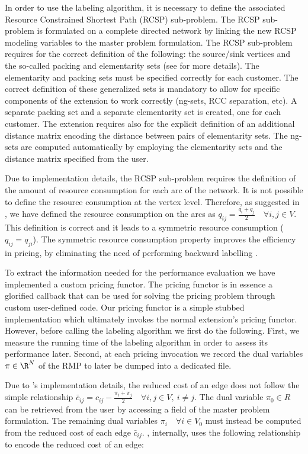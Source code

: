 In order to use the \vrpsolver{} labeling algorithm, it is necessary
to define the associated Resource Constrained Shortest Path (RCSP) sub-problem.
The RCSP sub-problem is formulated on a complete directed network by
linking the new RCSP modeling variables to the master problem formulation.
The RCSP sub-problem requires for the correct definition of the following:
the source/sink vertices and the so-called packing and elementarity sets
(see \cite{pessoa2020generic} for more details).
The elementarity and packing sets must be specified correctly for each customer.
The correct definition of these generalized sets is mandatory to allow for specific
components of the \vrpsolver{} extension to work correctly (ng-sets, RCC separation, etc).
A separate packing set and a separate elementarity set is created, one for each customer.
The \vrpsolver{} extension requires also for the explicit definition of an additional
distance matrix encoding the distance between pairs of elementarity sets.
The ng-sets are computed automatically by employing the elementarity sets
and the distance matrix specified from the user.

Due to implementation details, the RCSP sub-problem requires
the definition of the amount of resource consumption for each arc of the network.
It is not possible to define the resource consumption at the vertex level.
Therefore, as suggested in \textcite{pessoa2020generic}, we have defined the resource consumption
on the arcs as $q_{ij} = \frac{q_{i} + q_{j}}{2} \quad \forall i, j \in V$.
This definition is correct and it leads to a symmetric resource consumption ($q_{ij} = q_{ji}$).
The symmetric resource consumption property improves the efficiency in pricing,
by eliminating the need of performing backward labelling \parencite{pessoa2020generic}.

To extract the information needed for the performance evaluation we have implemented a custom pricing functor.
The pricing functor is in essence a glorified callback that can be used
for solving the pricing problem through custom user-defined code.
Our pricing functor is a simple stubbed implementation which ultimately invokes
the normal \vrpsolver{} extension's pricing functor.
However, before calling the labeling algorithm we first do the following.
First, we measure the running time of the labeling algorithm in order to assess its performance later.
Second, at each pricing invocation we record the dual variables $\pi \in \R^N$ of the RMP
to later be dumped into a dedicated file.

Due to \bapcod{}'s implementation details, the reduced cost of an
edge does not follow the simple relationship $\bar{c}_{ij} = c_{ij} - \frac{\pi_i + \pi_j}{2} \quad \forall i, j \in V,\ i \ne j$.
The dual variable $\pi_0 \in R$ can be retrieved from the user by accessing a field
of the master problem formulation.
The remaining dual variables $\pi_i \quad \forall i \in V_0$ must instead be computed
from the reduced cost of each edge $\bar{c}_{ij}$.
\bapcod{}, internally, uses the following relationship to encode the reduced cost of an edge:

